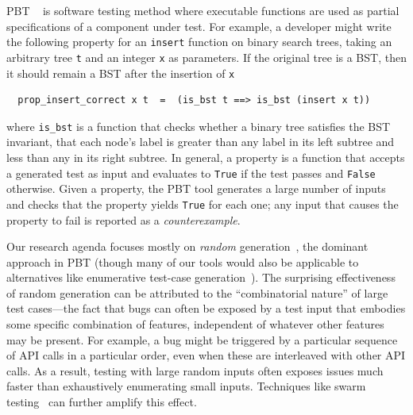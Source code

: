 %
PBT%
~\cite{hughes2007quickcheck}
is software testing method where
executable functions are used as partial
specifications of a component under test. For example, a developer might
write the following property for an \lstinline{insert}
function on binary search trees, taking an arbitrary tree \texttt{t}
and an integer
\texttt{x} as parameters. If the original tree
is a BST, then it should remain
a BST after the insertion of \texttt{x}
\begin{lstlisting}
  prop_insert_correct x t  =  (is_bst t ==> is_bst (insert x t))
\end{lstlisting}
where \lstinline{is_bst} is a function that checks whether a binary
tree satisfies the BST invariant, that each node's label is greater
than any label in its left subtree and less than any in its right
subtree.
In general, a property is a function that
accepts a generated
test as input \iflater{}\fi
and evaluates to \lstinline{True} if the test passes and
\lstinline{False} otherwise.
Given a property, the PBT tool generates a
large number of inputs and
checks that the property yields \lstinline{True} for each one; any input
that causes the property to fail is reported as a {\em counterexample}.

Our research agenda focuses mostly on {\em random}
generation~\cite{hamlet1994random}, the dominant approach in PBT
(though many of our tools would also be applicable to alternatives
like enumerative test-case
generation~\cite{DBLP:conf/haskell/RuncimanNL08, leancheck}).  The
surprising effectiveness of random generation can be attributed to the
``combinatorial nature'' of large test cases---the fact that bugs can
often be exposed by a test input that embodies some specific combination
of features, independent of whatever other features may be
present.  For example, a bug might be triggered by a particular
sequence of API calls in a particular order, even when
these are interleaved with other API calls. As a result, testing with
large random inputs often exposes issues much faster than exhaustively
enumerating small inputs.  Techniques like swarm
testing~\cite{groce2012swarm} can further amplify this effect.

